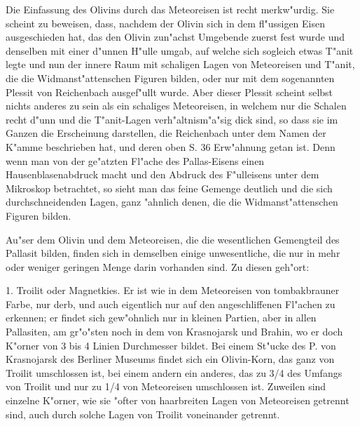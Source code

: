 \documentclass[a4paper, 11pt, oneside, german]{article}
\begin{document}
Die Einfassung des Olivins durch das Meteoreisen ist recht merkw"urdig. Sie scheint zu beweisen, dass, nachdem der Olivin sich in dem fl"ussigen Eisen ausgeschieden hat, das den Olivin zun"achst Umgebende zuerst fest wurde und denselben mit einer d"unnen H"ulle umgab, auf welche sich sogleich etwas T"anit legte und nun der innere Raum mit schaligen Lagen von Meteoreisen und T"anit, die die Widmanst"attenschen Figuren bilden, oder nur mit dem sogenannten Plessit von Reichenbach ausgef"ullt wurde. Aber dieser Plessit scheint selbst nichts anderes zu sein als ein schaliges Meteoreisen, in welchem nur die Schalen recht d"unn und die T"anit-Lagen verh"altnism"a"sig dick sind, so dass sie im Ganzen die Erscheinung darstellen, die Reichenbach unter dem Namen der K"amme beschrieben hat, und deren oben S. 36 Erw"ahnung getan ist. Denn wenn man von der ge"atzten Fl"ache des Pallas-Eisens einen Hausenblasenabdruck macht und den Abdruck des F"ulleisens unter dem Mikroskop betrachtet, so sieht man das feine Gemenge deutlich und die sich durchschneidenden Lagen, ganz "ahnlich denen, die die Widmanst"attenschen Figuren bilden.

Au"ser dem Olivin und dem Meteoreisen, die die wesentlichen Gemengteil des Pallasit bilden, finden sich in demselben einige unwesentliche, die nur in mehr oder weniger geringen Menge darin vorhanden sind. Zu diesen geh"ort:

1. Troilit oder Magnetkies. Er ist wie in dem Meteoreisen von tombakbrauner Farbe, nur derb, und auch eigentlich nur auf den angeschliffenen Fl"achen zu erkennen; er findet sich gew"ohnlich nur in kleinen Partien, aber in allen Pallasiten, am gr"o"sten noch in dem von Krasnojarsk und Brahin, wo er doch K"orner von 3 bis 4 Linien Durchmesser bildet. Bei einem St"ucke des P. von Krasnojarsk des Berliner Museums findet sich ein Olivin-Korn, das ganz von Troilit umschlossen ist, bei einem andern ein anderes, das zu 3/4 des Umfangs von Troilit und nur zu 1/4 von Meteoreisen umschlossen ist. Zuweilen sind einzelne K"orner, wie sie "ofter von haarbreiten Lagen von Meteoreisen getrennt sind, auch durch solche Lagen von Troilit voneinander getrennt.
\end{document}
